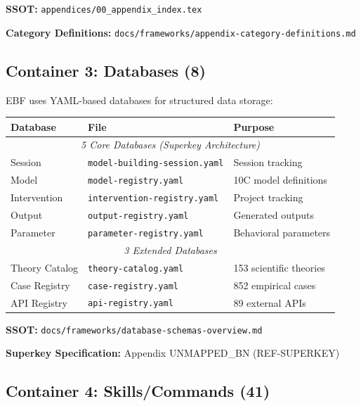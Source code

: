 \textbf{SSOT:} \texttt{appendices/00\_appendix\_index.tex}

\textbf{Category Definitions:} \texttt{docs/frameworks/appendix-category-definitions.md}


\subsection{Container 3: Databases (8)}
\label{sec:bo-databases}

EBF uses YAML-based databases for structured data storage:

\begin{center}
\begin{tabular}{|l|l|l|}
\hline
\textbf{Database} & \textbf{File} & \textbf{Purpose} \\
\hline
\multicolumn{3}{|c|}{\textit{5 Core Databases (Superkey Architecture)}} \\
\hline
Session & \texttt{model-building-session.yaml} & Session tracking \\
Model & \texttt{model-registry.yaml} & 10C model definitions \\
Intervention & \texttt{intervention-registry.yaml} & Project tracking \\
Output & \texttt{output-registry.yaml} & Generated outputs \\
Parameter & \texttt{parameter-registry.yaml} & Behavioral parameters \\
\hline
\multicolumn{3}{|c|}{\textit{3 Extended Databases}} \\
\hline
Theory Catalog & \texttt{theory-catalog.yaml} & 153 scientific theories \\
Case Registry & \texttt{case-registry.yaml} & 852 empirical cases \\
API Registry & \texttt{api-registry.yaml} & 89 external APIs \\
\hline
\end{tabular}
\end{center}

\textbf{SSOT:} \texttt{docs/frameworks/database-schemas-overview.md}

\textbf{Superkey Specification:} Appendix UNMAPPED_BN (REF-SUPERKEY)


\subsection{Container 4: Skills/Commands (41)}
\label{sec:bo-skills}

